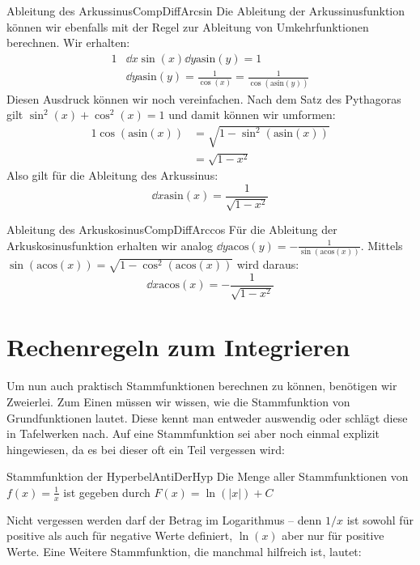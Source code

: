 \begin{example}{Ableitung des Arkussinus}{CompDiffArcsin}
    Die Ableitung der Arkussinusfunktion können wir ebenfalls mit der Regel zur Ableitung von Umkehrfunktionen berechnen. Wir erhalten:
    \begin{alignat*}{1}
        & \dd{}{x} \sin(x) \dd{}{y} \text{asin}(y) = 1 \\
        & \dd{}{y} \text{asin}(y) = \frac{1}{\cos(x)} = \frac{1}{\cos(\text{asin}(y))}
    \end{alignat*}
    Diesen Ausdruck können wir noch vereinfachen. Nach dem Satz des Pythagoras gilt $\sin^2(x) + \cos^2(x) = 1$ und damit können wir umformen:
    \begin{alignat*}{1}
        \cos(\text{asin}(x)) &= \sqrt{1 -  \sin^2(\text{asin}(x))} \\
                             & = \sqrt{1 - x^2}
    \end{alignat*}
    Also gilt für die Ableitung des Arkussinus:
    $$
        \dd{}{x} \text{asin}(x) = \frac{1}{\sqrt{1-x^2}}
    $$
\end{example}

\begin{example}{Ableitung des Arkuskosinus}{CompDiffArccos}
    Für die Ableitung der Arkuskosinusfunktion erhalten wir analog $\dd{}{y} \text{acos}(y) = -\frac{1}{\sin(\text{acos}(x))}$. Mittels $\sin(\text{acos}(x)) = \sqrt{1 - \cos^2(\text{acos}(x))}$ wird daraus:
    $$
        \dd{}{x} \text{acos}(x) = -\frac{1}{\sqrt{1-x^2}}
    $$
\end{example}


\section{Rechenregeln zum Integrieren}

Um nun auch praktisch Stammfunktionen berechnen zu können, benötigen wir Zweierlei. Zum Einen müssen wir wissen, wie die Stammfunktion von Grundfunktionen lautet. Diese kennt man entweder auswendig oder schlägt diese in Tafelwerken nach. Auf eine Stammfunktion sei aber noch einmal explizit hingewiesen, da es bei dieser oft ein Teil vergessen wird:

\begin{statement}{Stammfunktion der Hyperbel}{AntiDerHyp}
    Die Menge aller Stammfunktionen von $f(x) = \frac{1}{x}$ ist gegeben durch $F(x) = \ln(|x|) + C$
\end{statement}

Nicht vergessen werden darf der Betrag im Logarithmus -- denn $1/x$ ist sowohl für positive als auch für negative Werte definiert, $\ln(x)$ aber nur für positive Werte. Eine Weitere Stammfunktion, die manchmal hilfreich ist, lautet:

